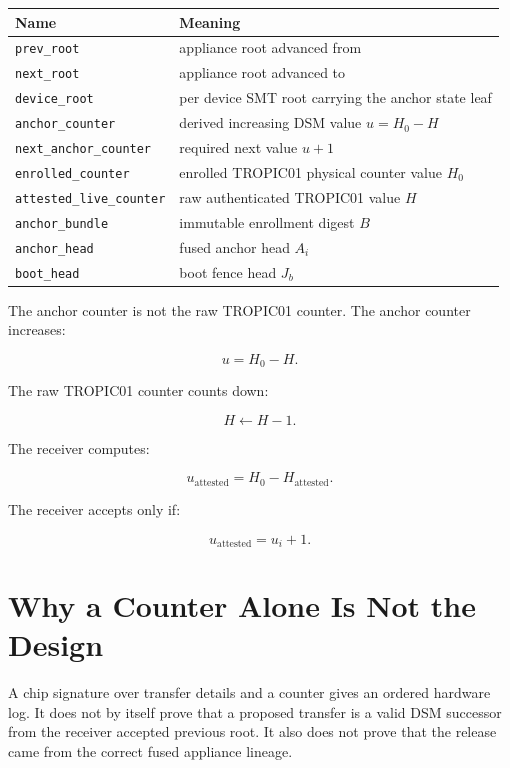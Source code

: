\documentclass[11pt]{article}
\theoremstyle{definition}
\theoremstyle{remark}
\newcommand{\Bundle}{\ensuremath{B}}
\newcommand{\Ahead}{\ensuremath{A}}
\newcommand{\Bhead}{\ensuremath{J}}
\begin{document}
\begin{center}
\begin{tabular}{ll}
\toprule
\textbf{Name} & \textbf{Meaning}\\
\midrule
\texttt{prev\_root} & appliance root advanced from\\
\texttt{next\_root} & appliance root advanced to\\
\texttt{device\_root} & per device SMT root carrying the anchor state leaf\\
\texttt{anchor\_counter} & derived increasing DSM value \(u=H_0-H\)\\
\texttt{next\_anchor\_counter} & required next value \(u+1\)\\
\texttt{enrolled\_counter} & enrolled TROPIC01 physical counter value \(H_0\)\\
\texttt{attested\_live\_counter} & raw authenticated TROPIC01 value \(H\)\\
\texttt{anchor\_bundle} & immutable enrollment digest \(\Bundle\)\\
\texttt{anchor\_head} & fused anchor head \(\Ahead_i\)\\
\texttt{boot\_head} & boot fence head \(\Bhead_b\)\\
\bottomrule
\end{tabular}
\end{center}

The anchor counter is not the raw TROPIC01 counter. The anchor counter increases:

\[
u=H_0-H.
\]

The raw TROPIC01 counter counts down:

\[
H\leftarrow H-1.
\]

The receiver computes:

\[
u_{\mathrm{attested}}=H_0-H_{\mathrm{attested}}.
\]

The receiver accepts only if:

\[
u_{\mathrm{attested}}=u_i+1.
\]

\section{Why a Counter Alone Is Not the Design}

A chip signature over transfer details and a counter gives an ordered hardware log. It does not
by itself prove that a proposed transfer is a valid DSM successor from the receiver accepted
previous root. It also does not prove that the release came from the correct fused appliance
lineage.
\end{document}
